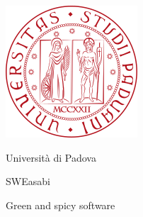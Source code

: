 \documentclass{article}
\begin{document}
\begin{center}
    \begin{minipage}{0.49\linewidth}
        \begin{flushleft}

        \begin{minipage}{0.5\linewidth}
        \begin{center}
        \includegraphics[width=1\linewidth]{../../assets_globali/img/logo_unipd.png}
        
        \normalsize Università di Padova
        
        \end{center}
        \end{minipage}
        \end{flushleft}
    \end{minipage}
    \begin{minipage}{0.49\linewidth}
        \begin{flushright}

        \begin{minipage}{0.5\linewidth}
        \begin{center}

        \Large SWEasabi

        \tiny Green and spicy software


\end{center}
\end{minipage}
\end{flushright}
\end{minipage}
\end{center}
\end{document}

